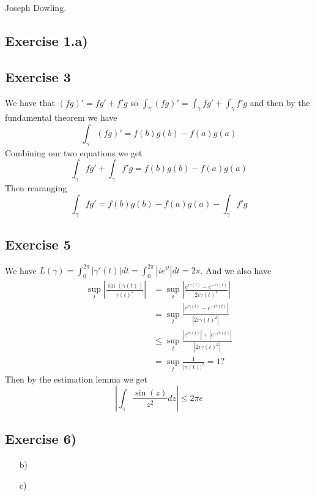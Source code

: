 \documentclass[a4paper, 12pt, twoside]{article}
\author{Joseph}
\begin{document}
Joseph Dowling.
\subsection*{Exercise 1.a)}


\subsection*{Exercise 3}
We have that $(fg)'=fg'+f'g$ so $\int_{\gamma}(fg)'=\int_{\gamma}fg'+\int_{\gamma}f'g$ and then by the fundamental theorem we have
$$\int_{\gamma}(fg)'=f(b)g(b)-f(a)g(a) $$
Combining our two equations we get
$$\int_{\gamma}fg'+\int_{\gamma}f'g=f(b)g(b)-f(a)g(a) $$
Then rearanging
$$\int_{\gamma}fg'=f(b)g(b)-f(a)g(a)-\int_{\gamma}f'g$$
\subsection*{Exercise 5}
We have $L(\gamma)=\int_{0}^{2\pi}|\gamma'(t)|dt=\int_{0}^{2\pi}|ie^{it}|dt=2\pi $. And we also have
\begin{align*}
    \sup_{t}|\frac{\sin(\gamma(t))}{\gamma(t)^{2}}| &= \sup_{t} |\frac{e^{i\gamma(t)}-e^{-i\gamma(t)}}{2i\gamma(t)^{2}}| \\
    & = \sup_{t} \frac{|e^{i\gamma(t)}-e^{-i\gamma(t)}|}{|2i\gamma(t)^{2}|}\\
    & \leq \sup_{t} \frac{|e^{i\gamma(t)}|+|e^{-i\gamma(t)}|}{|2i\gamma(t)^{2}|}\\
    &= \sup_{t} \frac{1}{|\gamma(t)|^{2}} = 1?
\end{align*}
Then by the estimation lemma we get
$$|\int_{\gamma}\frac{\sin(z)}{z^{2}}dz|\leq 2\pi e $$
\subsection*{Exercise 6)}
\begin{itemize}
    \item[b)]
    \item[c)]
\end{itemize}
\end{document}
